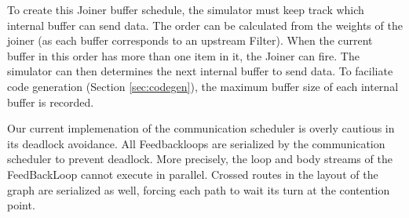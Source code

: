 To create this Joiner buffer schedule, the simulator must keep track
which internal buffer can send data.  The order can be calculated from
the weights of the joiner (as each buffer corresponds to an upstream
Filter).  When the current buffer in this order has more than one item
in it, the Joiner can fire.  The simulator can then determines the
next internal buffer to send data.  To faciliate code generation
(Section \ref{sec:codegen}), the maximum buffer size of each internal
buffer is recorded.

Our current implemenation of the communication scheduler is overly
cautious in its deadlock avoidance.  All Feedbackloops are serialized
by the communication scheduler to prevent deadlock.  More precisely, 
the loop and body streams of the FeedBackLoop cannot execute in
parallel.  Crossed routes in the layout of the graph are serialized as
well, forcing each path to wait its turn at the contention point.
